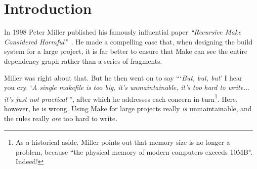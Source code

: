\section{Introduction}

In 1998 Peter Miller published his famously influential paper
\emph{``Recursive Make Considered Harmful''}~\cite{miller:recursive_make}.
He made a compelling case that, when designing the build system for
a large project, it is far better to ensure that Make can see
the entire dependency graph rather than a series of fragments.

Miller was right about that.  But he then went on to say ```\emph{But, but, but}'
I hear you cry.  `\emph{A single makefile is too big, it's unmaintainable,
it's too hard to write... it's just not practical}''', after which he
addresses each concern in turn\footnote{
As a historical aside, Miller points out that memory size is no
longer a problem, because
``the physical memory of modern computers exceeds 10MB''.  Indeed!}.
Here, however, he is wrong.  Using
Make for large projects really \emph{is} unmaintainable, and the rules really
\emph{are} too hard to write.

